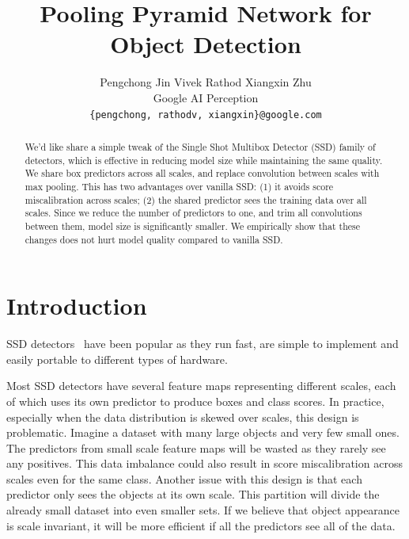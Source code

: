 \documentclass[10pt,twocolumn,letterpaper]{article}
\begin{document}
\title{Pooling Pyramid Network for Object Detection}

\author{
Pengchong Jin
\hspace*{32pt}
Vivek Rathod
\hspace*{32pt}
Xiangxin Zhu
\\
Google AI Perception\\
{\tt\small \{pengchong, rathodv, xiangxin\}@google.com}
}


\maketitle

\begin{abstract}
  We'd like share a simple tweak of the Single Shot Multibox Detector
  (SSD) family of detectors,
  which is effective in reducing model size while
  maintaining the same quality. We share box predictors
  across all scales, and replace convolution between
  scales with max pooling. This has two advantages over vanilla
  SSD: (1) it avoids score miscalibration across scales; (2)
  the shared predictor sees the training data over all
  scales. Since we reduce the number of predictors to one, and
  trim all convolutions between them, model size is
  significantly smaller. We empirically show that these changes
  does not hurt model quality compared to vanilla SSD.

\end{abstract}

\section{Introduction}
SSD detectors~\cite{liu2016ssd,lin2017focal} have
been popular as they run fast, are simple to implement
and easily portable to different types of hardware.


Most SSD detectors have several feature maps
representing different scales, each of which uses its own
predictor to produce boxes and class scores.
In practice, especially when the data distribution is skewed
over scales, this design is problematic. Imagine a
dataset with many large objects and very few small ones.
The predictors from small scale feature maps will be
wasted as they rarely see any positives. This data imbalance
could also result in score miscalibration across scales even
for the same class. Another issue with this design is that
each predictor only sees the objects at its own scale. This
partition will divide the already small dataset
into even smaller sets. If we believe that object
appearance is scale invariant, it will be more efficient
if all the predictors see all of the data.
\end{document}
